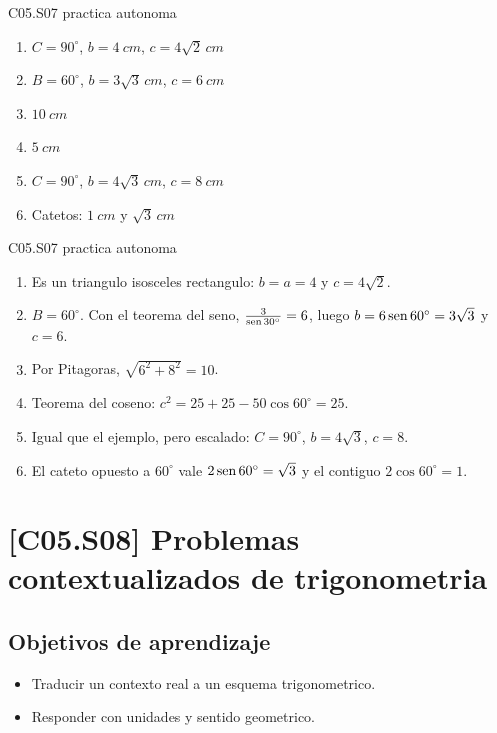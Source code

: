 \begin{shortanswer}{C05.S07 practica autonoma}
\begin{enumerate}[label=\textbf{PX-C05.S07-\arabic*:}, leftmargin=*]
  \item \(C=90^\circ\), \(b=\SI{4}{cm}\), \(c=4\sqrt{2}\,\si{cm}\)
  \item \(B=60^\circ\), \(b=3\sqrt{3}\,\si{cm}\), \(c=\SI{6}{cm}\)
  \item \(\SI{10}{cm}\)
  \item \(\SI{5}{cm}\)
  \item \(C=90^\circ\), \(b=4\sqrt{3}\,\si{cm}\), \(c=\SI{8}{cm}\)
  \item Catetos: \(\SI{1}{cm}\) y \(\sqrt{3}\,\si{cm}\)
\end{enumerate}
\end{shortanswer}

\begin{fullsolution}{C05.S07 practica autonoma}
\begin{enumerate}[label=\textbf{PX-C05.S07-\arabic*:}, leftmargin=*]
  \item Es un triangulo isosceles rectangulo: \(b=a=4\) y \(c=4\sqrt{2}\).
  \item \(B=60^\circ\). Con el teorema del seno, \(\frac{3}{\operatorname{sen} 30^\circ}=6\), luego \(b=6\operatorname{sen} 60^\circ=3\sqrt{3}\) y \(c=6\).
  \item Por Pitagoras, \(\sqrt{6^2+8^2}=10\).
  \item Teorema del coseno: \(c^2=25+25-50\cos 60^\circ=25\).
  \item Igual que el ejemplo, pero escalado: \(C=90^\circ\), \(b=4\sqrt{3}\), \(c=8\).
  \item El cateto opuesto a \(60^\circ\) vale \(2\operatorname{sen} 60^\circ=\sqrt{3}\) y el contiguo
  \(2\cos 60^\circ=1\).
\end{enumerate}
\end{fullsolution}

\section{[C05.S08] Problemas contextualizados de trigonometria}

\subsection*{Objetivos de aprendizaje}
\begin{itemize}
  \item Traducir un contexto real a un esquema trigonometrico.
  \item Responder con unidades y sentido geometrico.
\end{itemize}

